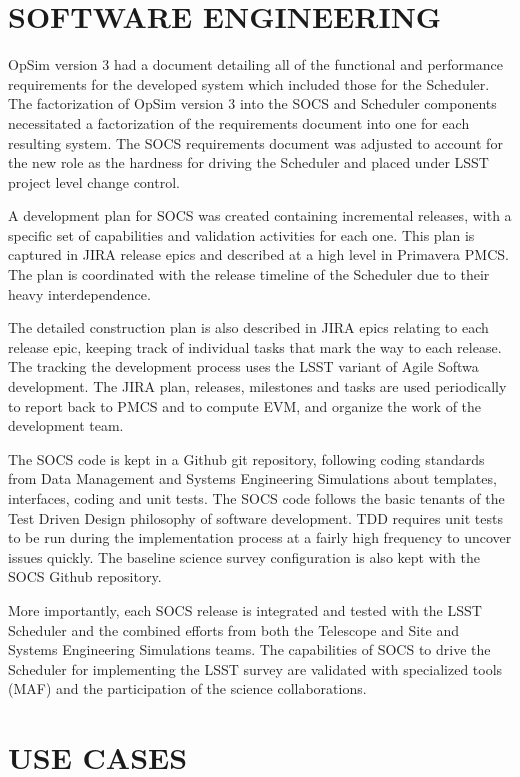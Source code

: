 \documentclass[]{spie}  %
\begin{document}
\section{SOFTWARE ENGINEERING}

OpSim version 3 had a document detailing all of the functional and performance requirements for the developed system which included those for the Scheduler. The factorization of OpSim version 3 into the SOCS and Scheduler components necessitated a factorization of the requirements document into one for each resulting system. The SOCS requirements document was adjusted to account for the new role as the hardness for driving the Scheduler and placed under LSST project level change control.

A development plan for SOCS was created containing incremental releases, with a specific set of capabilities and validation activities for each one. This plan is captured in JIRA\cite{JIRA} release epics and described at a high level in Primavera PMCS. The plan is coordinated with the release timeline of the Scheduler due to their heavy interdependence.

The detailed construction plan is also described in JIRA epics relating to each release epic, keeping track of individual tasks that mark the way to each release. The tracking the development process uses the LSST variant of Agile Softwa development\cite{Kantor_SPIE2016}. The JIRA plan, releases, milestones and tasks are used periodically to report back to PMCS and to compute EVM, and organize the work of the development team.

The SOCS code is kept in a Github\cite{GitHub} git repository, following coding standards from Data Management and Systems Engineering Simulations about templates, interfaces, coding and unit tests. The SOCS code follows the basic tenants of the Test Driven Design philosophy of software development. TDD requires unit tests to be run during the implementation process at a fairly high frequency to uncover issues quickly. The baseline science survey configuration is also kept with the SOCS Github repository. 

More importantly, each SOCS release is integrated and tested with the LSST Scheduler and the combined efforts from both the Telescope and Site and Systems Engineering Simulations teams. The capabilities of SOCS to drive the Scheduler for implementing the LSST survey are validated with specialized tools (MAF) and the participation of the science collaborations.

\section{USE CASES}
\end{document}
